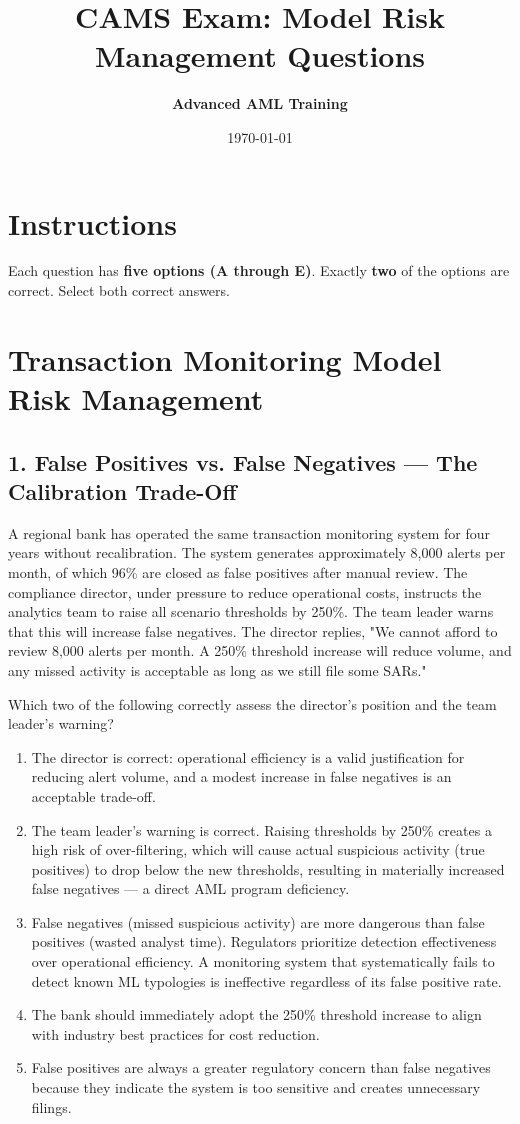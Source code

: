 \documentclass[11pt,a4paper]{article}
\title{\textbf{CAMS Exam: Model Risk Management Questions}}
\author{\textbf{Advanced AML Training}}
\date{\today}
\begin{document}
	
	\maketitle
	
	\section*{Instructions}
	Each question has \textbf{five options (A through E)}. Exactly \textbf{two} of the options are correct. Select both correct answers.
	
	\section{Transaction Monitoring Model Risk Management}
	
	\subsection{1. False Positives vs. False Negatives — The Calibration Trade-Off}
	
	A regional bank has operated the same transaction monitoring system for four years without recalibration. The system generates approximately 8,000 alerts per month, of which 96\% are closed as false positives after manual review. The compliance director, under pressure to reduce operational costs, instructs the analytics team to raise all scenario thresholds by 250\%. The team leader warns that this will increase false negatives. The director replies, "We cannot afford to review 8,000 alerts per month. A 250\% threshold increase will reduce volume, and any missed activity is acceptable as long as we still file some SARs."
	
	Which two of the following correctly assess the director's position and the team leader's warning?
	
	\begin{enumerate}[label=\Alph*.]
		\item The director is correct: operational efficiency is a valid justification for reducing alert volume, and a modest increase in false negatives is an acceptable trade-off.
		\item The team leader's warning is correct. Raising thresholds by 250\% creates a high risk of over-filtering, which will cause actual suspicious activity (true positives) to drop below the new thresholds, resulting in materially increased false negatives — a direct AML program deficiency.
		\item False negatives (missed suspicious activity) are more dangerous than false positives (wasted analyst time). Regulators prioritize detection effectiveness over operational efficiency. A monitoring system that systematically fails to detect known ML typologies is ineffective regardless of its false positive rate.
		\item The bank should immediately adopt the 250\% threshold increase to align with industry best practices for cost reduction.
		\item False positives are always a greater regulatory concern than false negatives because they indicate the system is too sensitive and creates unnecessary filings.
	\end{enumerate}
	
\end{document}
